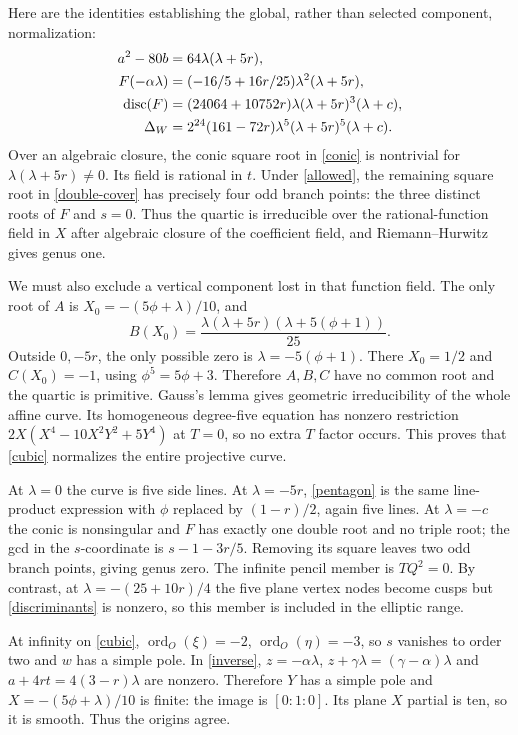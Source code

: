\documentclass[11pt]{article}
\newcommand{\disc}{\operatorname{disc}}
\newcommand{\ord}{\operatorname{ord}}
\begin{document}
Here are the identities establishing the global, rather than selected
component, normalization:
\begin{align}
a^2-80b&=64\lambda(\lambda+5r),\notag\\
F(-\alpha\lambda)&=(-16/5+16r/25)\lambda^2(\lambda+5r),\notag\\
\disc(F)&=(24064+10752r)\lambda(\lambda+5r)^3(\lambda+c),\notag\\
\Delta_W&=2^{24}(161-72r)\lambda^5(\lambda+5r)^5(\lambda+c).
\label{discriminants}
\end{align}
Over an algebraic closure, the conic square root in \eqref{conic} is
nontrivial for $\lambda(\lambda+5r)\ne0$. Its field is rational in $t$.
Under \eqref{allowed}, the remaining square root in
\eqref{double-cover} has precisely four odd branch points: the three
distinct roots of $F$ and $s=0$. Thus the quartic is irreducible over the rational-function field in $X$
after algebraic closure of the coefficient field, and Riemann--Hurwitz
gives genus one.

We must also exclude a vertical component lost in that function field.
The only root of $A$ is $X_0=-(5\phi+\lambda)/10$, and
\[
B(X_0)=\frac{\lambda(\lambda+5r)(\lambda+5(\phi+1))}{25}.
\]
Outside $0,-5r$, the only possible zero is $\lambda=-5(\phi+1)$.
There $X_0=1/2$ and $C(X_0)=-1$, using $\phi^5=5\phi+3$.
Therefore $A,B,C$ have no common root and the quartic is primitive.
Gauss's lemma gives geometric irreducibility of the whole affine curve.
Its homogeneous degree-five equation has nonzero restriction
$2X(X^4-10X^2Y^2+5Y^4)$ at $T=0$, so no extra $T$ factor occurs.
This proves that \eqref{cubic} normalizes the entire projective curve.

At $\lambda=0$ the curve is five side lines. At $\lambda=-5r$,
\eqref{pentagon} is the same line-product expression with $\phi$
replaced by $(1-r)/2$, again five lines. At $\lambda=-c$ the conic is
nonsingular and $F$ has exactly one double root and no triple root; the
gcd in the $s$-coordinate is $s-1-3r/5$. Removing its square leaves two
odd branch points, giving genus zero. The infinite pencil member is
$TQ^2=0$. By contrast, at $\lambda=-(25+10r)/4$ the five plane vertex
nodes become cusps but \eqref{discriminants} is nonzero, so this member
is included in the elliptic range.

At infinity on \eqref{cubic}, $\ord_O(\xi)=-2$, $\ord_O(\eta)=-3$,
so $s$ vanishes to order two and $w$ has a simple pole. In
\eqref{inverse}, $z=-\alpha\lambda$, $z+\gamma\lambda=(\gamma-\alpha)\lambda$
and $a+4rt=4(3-r)\lambda$ are nonzero. Therefore $Y$ has a simple pole
and $X=-(5\phi+\lambda)/10$ is finite: the image is $[0:1:0]$.
Its plane $X$ partial is ten, so it is smooth. Thus the origins agree.
\end{document}
